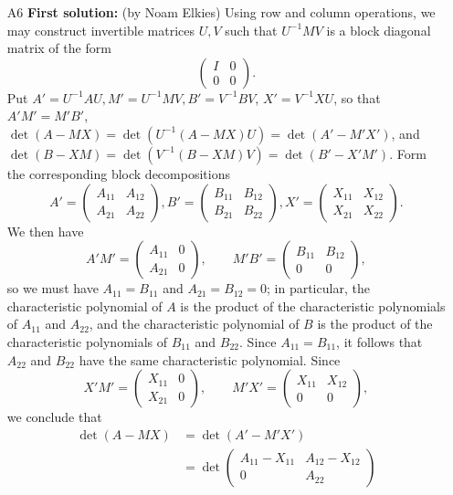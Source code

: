 \documentclass[amssymb,twocolumn,pra,10pt,aps]{revtex4-1}
\begin{document}
\begin{itemize}
\item[A6]
\textbf{First solution:}
(by Noam Elkies)
Using row and column operations, we may construct invertible matrices $U,V$ such that
$U^{-1} M V$ is a block diagonal matrix of the form
\[
\begin{pmatrix} I & 0 \\ 0 & 0 \end{pmatrix}.
\]
Put $A' = U^{-1} A U, M' = U^{-1} M V, B' = V^{-1} B V$, $X' = V^{-1} X U$,
so that $A' M' = M' B'$,
$\det(A-MX) = \det(U^{-1}(A-MX)U) = \det(A' - M'X')$,
and
$\det(B-XM) = \det(V^{-1}(B-XM)V) = \det(B' - X'M')$.
Form the corresponding block decompositions
\[
A' = \begin{pmatrix} A_{11} & A_{12} \\ A_{21} & A_{22} \end{pmatrix},
B' = \begin{pmatrix} B_{11} & B_{12} \\ B_{21} & B_{22} \end{pmatrix},
X' = \begin{pmatrix} X_{11} & X_{12} \\ X_{21} & X_{22} \end{pmatrix}.
\]
We then have
\[
A' M' = \begin{pmatrix} A_{11} & 0 \\ A_{21} & 0 \end{pmatrix}, \qquad
M' B' = \begin{pmatrix} B_{11} & B_{12} \\ 0 & 0 \end{pmatrix},
\]
so we must have $A_{11} = B_{11}$ and $A_{21} = B_{12} = 0$;
in particular, the characteristic polynomial of $A$ is the product of the characteristic polynomials of $A_{11}$ and $A_{22}$, and the characteristic polynomial of $B$ is the product of the characteristic polynomials of $B_{11}$ and $B_{22}$. Since $A_{11} = B_{11}$, it follows that $A_{22}$ and $B_{22}$ have the same characteristic polynomial.
Since
\[
X' M' = \begin{pmatrix} X_{11} & 0 \\ X_{21} & 0 \end{pmatrix}, \qquad
M' X' = \begin{pmatrix} X_{11} & X_{12} \\ 0 & 0 \end{pmatrix},
\]
we conclude that
\begin{align*}
\det(A-MX) &= \det(A'-M'X') \\
&= \det \begin{pmatrix} A_{11}-X_{11} & A_{12} - X_{12} \\ 0 & A_{22} \end{pmatrix} \\

\end{align*}
\end{itemize}
\end{document}
